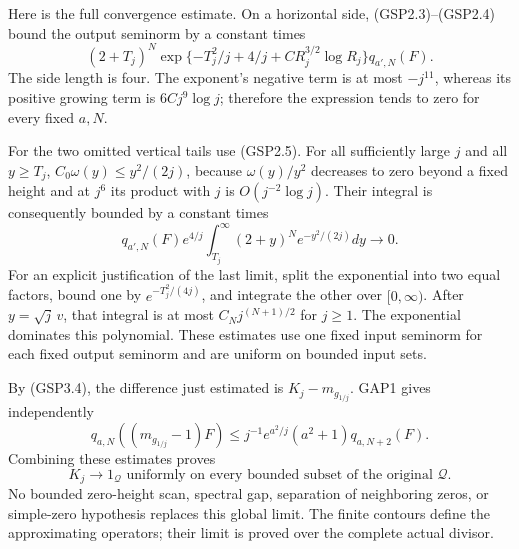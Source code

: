 Here is the full convergence estimate. On a horizontal side,
(GSP2.3)--(GSP2.4) bound the output seminorm by a constant times \[
(2+T_j)^N\exp\{-T_j^2/j+4/j+C R_j^{3/2}\log R_j\}
q_{a',N}(F).
\tag{GSP4.4}
\] The side length is four. The exponent's negative term is at most
\(-j^{11}\), whereas its positive growing term is \(6Cj^9\log j\);
therefore the expression tends to zero for every fixed \(a,N\).

For the two omitted vertical tails use (GSP2.5). For all sufficiently
large \(j\) and all \(y\ge T_j\), \(C_0\omega(y)\le y^2/(2j)\), because
\(\omega(y)/y^2\) decreases to zero beyond a fixed height and at \(j^6\)
its product with \(j\) is \(O(j^{-2}\log j)\). Their integral is
consequently bounded by a constant times \[
q_{a',N}(F)e^{4/j}\int_{T_j}^\infty(2+y)^N e^{-y^2/(2j)}dy\longrightarrow0.
\tag{GSP4.5}
\] For an explicit justification of the last limit, split the
exponential into two equal factors, bound one by \(e^{-T_j^2/(4j)}\),
and integrate the other over \([0,\infty)\). After \(y=\sqrt j\,v\),
that integral is at most \(C_N j^{(N+1)/2}\) for \(j\ge1\). The
exponential dominates this polynomial. These estimates use one fixed
input seminorm for each fixed output seminorm and are uniform on bounded
input sets.

By (GSP3.4), the difference just estimated is \(K_j-m_{g_{1/j}}\). GAP1
gives independently \[
q_{a,N}((m_{g_{1/j}}-1)F)
\le j^{-1}e^{a^2/j}(a^2+1)q_{a,N+2}(F).
\tag{GSP4.6}
\] Combining these estimates proves \[
\boxed{K_j\longrightarrow1_{\mathcal Q}
\text{ uniformly on every bounded subset of the original }\mathcal Q.}
\tag{GSP4.7}
\] No bounded zero-height scan, spectral gap, separation of neighboring
zeros, or simple-zero hypothesis replaces this global limit. The finite
contours define the approximating operators; their limit is proved over
the complete actual divisor.

